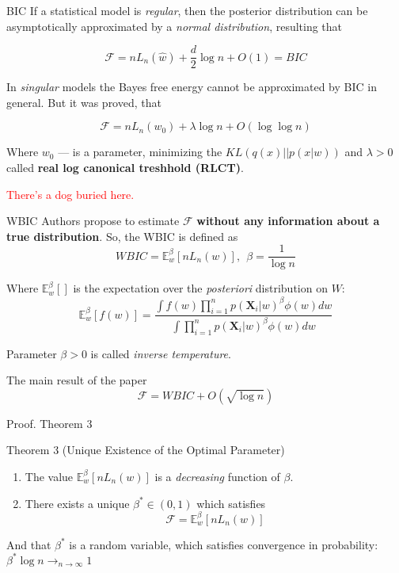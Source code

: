 \documentclass{beamer}
\begin{document}
\begin{frame}{BIC}
If a statistical model is \textit{regular}, then the posterior distribution can be asymptotically approximated by a \textit{normal distribution}, resulting that

$$
\mathcal{F} = nL_n(\hat{w}) + \frac{d}{2}\log n + O(1) = BIC
$$

In \textit{singular} models the Bayes free energy cannot be approximated by BIC in general. But it was proved, that

$$
\mathcal{F} = nL_n(w_0) + \lambda \log n + O(\log \log n)
$$

Where $w_0$ --- is a parameter, minimizing the $KL(q(x)||p(x|w))$ and $\lambda > 0$ called \textbf{real log canonical treshhold (RLCT)}.
\newline

\textcolor{red}{There's a dog buried here.}
\end{frame}

\begin{frame}{WBIC}
Authors propose to estimate $\mathcal{F}$ \textbf{without any information about a true distribution}. So, the WBIC is defined as
$$
WBIC = \mathbb{E}_{w}^{\beta}\left[nL_n(w) \right], \ \ \beta = \frac{1}{\log n}
$$

Where $\mathbb{E}_w^{\beta}[]$ is the expectation over the \textit{posteriori} distribution on $W$:
$$
\mathbb{E}_w^{\beta}\left[f(w) \right] = \frac{\int f(w)\prod\limits_{i=1}^np(\mathbf{X}_i|w)^{\beta}\phi(w)dw}{\int \prod\limits_{i=1}^np(\mathbf{X}_i|w)^{\beta}\phi(w)dw}
$$

Parameter $\beta > 0$ is called \textit{inverse temperature}.

\begin{block}{The main result of the paper}
    $$
        \mathcal{F} = WBIC + O(\sqrt{\log n})
    $$
\end{block}
\end{frame}


\begin{frame}{Proof. Theorem 3}
\begin{block}{Theorem 3 (Unique Existence of the Optimal Parameter)}

    \begin{enumerate}
        \item The value $\mathbb{E}_w^{\beta}\left[nL_n(w) \right]$ is a \textit{decreasing} function of $\beta$.
        \item There exists a unique $\beta^* \in (0, 1)$ which satisfies
        $$
            \mathcal{F} = \mathbb{E}_w^{\beta}\left[nL_n(w) \right]
        $$
    \end{enumerate}
    
    And that $\beta^*$ is a random variable, which satisfies convergence in probability: $\beta^* \log n \to_{n \to \infty} 1$
\end{block}
\end{frame}
\end{document}

